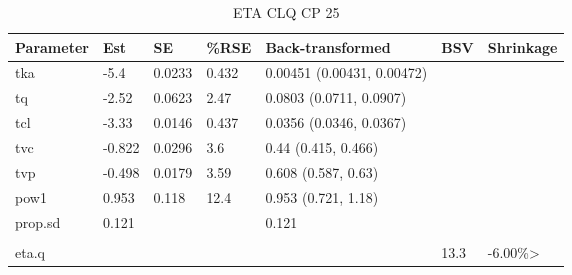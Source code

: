 \begin{table}
\centering\centering
\caption{ETA CLQ CP 25}
\centering
\fontsize{8}{10}\selectfont
\begin{tabular}[t]{lllllll}
\toprule
\textbf{Parameter} & \textbf{Est} & \textbf{SE} & \textbf{\%RSE} & \textbf{Back-transformed} & \textbf{BSV} & \textbf{Shrinkage}\\
\midrule
tka & -5.4 & 0.0233 & 0.432 & 0.00451 (0.00431, 0.00472) &  & \\
\midrule
tq & -2.52 & 0.0623 & 2.47 & 0.0803 (0.0711, 0.0907) &  & \\
\midrule
tcl & -3.33 & 0.0146 & 0.437 & 0.0356 (0.0346, 0.0367) &  & \\
\midrule
tvc & -0.822 & 0.0296 & 3.6 & 0.44 (0.415, 0.466) &  & \\
\midrule
tvp & -0.498 & 0.0179 & 3.59 & 0.608 (0.587, 0.63) &  & \\
\midrule
pow1 & 0.953 & 0.118 & 12.4 & 0.953 (0.721, 1.18) &  & \\
\midrule
prop.sd & 0.121 &  &  & 0.121 &  & \\
\midrule\\
eta.q &  &  &  &  & 13.3 & -6.00\%>\\
\bottomrule
\end{tabular}
\end{table}